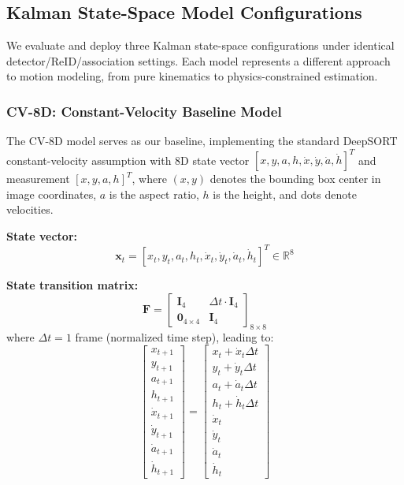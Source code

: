 \subsection{Kalman State-Space Model Configurations}
We evaluate and deploy three Kalman state-space configurations under identical detector/ReID/association settings. Each model represents a different approach to motion modeling, from pure kinematics to physics-constrained estimation.

\subsubsection{CV-8D: Constant-Velocity Baseline Model}
The CV-8D model serves as our baseline, implementing the standard DeepSORT constant-velocity assumption with 8D state vector $[x, y, a, h, \dot{x}, \dot{y}, \dot{a}, \dot{h}]^T$ and measurement $[x, y, a, h]^T$, where $(x,y)$ denotes the bounding box center in image coordinates, $a$ is the aspect ratio, $h$ is the height, and dots denote velocities.

\textbf{State vector:}
\begin{equation}
\mathbf{x}_t = [x_t, y_t, a_t, h_t, \dot{x}_t, \dot{y}_t, \dot{a}_t, \dot{h}_t]^T \in \mathbb{R}^{8}
\end{equation}

\textbf{State transition matrix:}
\begin{equation}
\mathbf{F} = \begin{bmatrix}
\mathbf{I}_4 & \Delta t \cdot \mathbf{I}_4 \\
\mathbf{0}_{4 \times 4} & \mathbf{I}_4
\end{bmatrix}_{8 \times 8}
\end{equation}
where $\Delta t = 1$ frame (normalized time step), leading to:
\begin{equation}
\begin{bmatrix}
x_{t+1} \\ y_{t+1} \\ a_{t+1} \\ h_{t+1} \\ \dot{x}_{t+1} \\ \dot{y}_{t+1} \\ \dot{a}_{t+1} \\ \dot{h}_{t+1}
\end{bmatrix}
=
\begin{bmatrix}
x_t + \dot{x}_t \Delta t \\
y_t + \dot{y}_t \Delta t \\
a_t + \dot{a}_t \Delta t \\
h_t + \dot{h}_t \Delta t \\
\dot{x}_t \\
\dot{y}_t \\
\dot{a}_t \\
\dot{h}_t
\end{bmatrix}
\end{equation}

